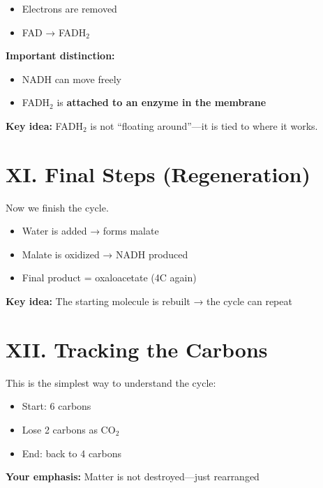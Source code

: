\documentclass[9pt]{article}
\begin{document}
\begin{itemize}
\item Electrons are removed
\item FAD → FADH$_2$
\end{itemize}

\textbf{Important distinction:}
\begin{itemize}
\item NADH can move freely
\item FADH$_2$ is \textbf{attached to an enzyme in the membrane}
\end{itemize}

\textbf{Key idea:}  
FADH$_2$ is not “floating around”—it is tied to where it works.


\section*{XI. Final Steps (Regeneration)}

Now we finish the cycle.

\begin{itemize}
\item Water is added → forms malate
\item Malate is oxidized → NADH produced
\item Final product = oxaloacetate (4C again)
\end{itemize}

\textbf{Key idea:}  
The starting molecule is rebuilt → the cycle can repeat


\section*{XII. Tracking the Carbons}

This is the simplest way to understand the cycle:

\begin{itemize}
\item Start: 6 carbons
\item Lose 2 carbons as CO$_2$
\item End: back to 4 carbons
\end{itemize}

\textbf{Your emphasis:}  
Matter is not destroyed—just rearranged

\end{document}
